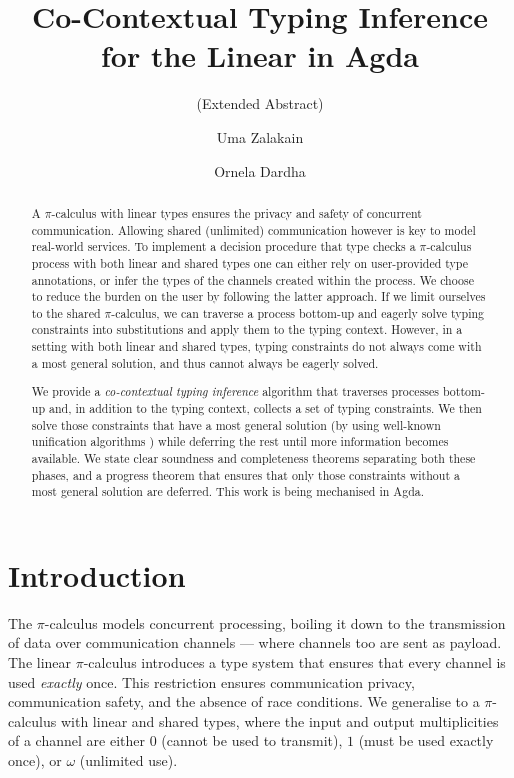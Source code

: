 \documentclass[sigplan,screen,review]{acmart}
\title
[Co-Contextual Typing Inference for the Linear \Picalc{} in Agda]
{Co-Contextual Typing Inference \\ for the Linear \Picalc{} in Agda}
\subtitle{(Extended Abstract)}
\author{Uma Zalakain}
\affiliation{University of Glasgow}
\author{Ornela Dardha}
\affiliation{University of Glasgow}
\newcommand{\picalc}{$\pi$-calculus}
\begin{document}
\begin{abstract}
  A \picalc{} with linear types ensures the privacy and safety of concurrent communication.
  Allowing shared (unlimited) communication however is key to model real-world services.
  To implement a decision procedure that type checks a \picalc{} process with both linear and shared types one can either rely on user-provided type annotations, or infer the types of the channels created within the process.
  We choose to reduce the burden on the user by following the latter approach.
  If we limit ourselves to the shared \picalc{}, we can traverse a process bottom-up and eagerly solve typing constraints into substitutions and apply them to the typing context.
  However, in a setting with both linear and shared types, typing constraints do not always come with a most general solution, and thus cannot always be eagerly solved.

  We provide a \emph{co-contextual typing inference} \cite{ErdwegBKKM15} algorithm that traverses processes bottom-up and, in addition to the typing context, collects a set of typing constraints.
  We then solve those constraints that have a most general solution (by using well-known unification algorithms \cite{McBride03}) while deferring the rest until more information becomes available.
  We state clear soundness and completeness theorems separating both these phases, and a progress theorem that ensures that only those constraints without a most general solution are deferred.
  This work is being mechanised in Agda.
\end{abstract}


\maketitle

\section{Introduction}\label{introduction}

The \picalc{} \cite{MilnerPW92a,Milner99} models concurrent processing, boiling it down to the transmission of data over communication channels --- where channels too are sent as payload.
The linear \picalc{} \cite{KobayashiPT96} introduces a type system that ensures that every channel is used \emph{exactly} once.
This restriction ensures communication privacy, communication safety, and the absence of race conditions.
We generalise to a \picalc{} with linear and shared types, where the input and output multiplicities of a channel are either $0$ (cannot be used to transmit), $1$ (must be used exactly once), or $\omega$ (unlimited use).
\end{document}
